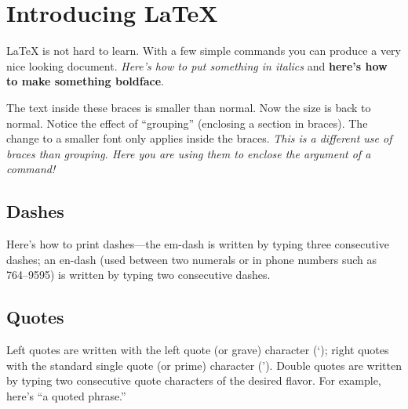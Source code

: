 \documentclass{article}                    %
\begin{document}
 
\section{Introducing LaTeX}                %
LaTeX is not hard to learn.  With a few simple commands you
can produce a very nice looking document.
\textit{Here's how to put something in italics} and 
\textbf{here's how to make something boldface}.

{\small The text inside these braces is smaller than normal.} Now the size
is back to normal.  
Notice the effect of ``grouping'' (enclosing a section in braces). 
The change to a smaller font only applies inside the braces. 
\textit{This is a different use of braces than grouping. Here you are
using them to enclose the argument of a command!}
  
\subsection{Dashes}                        %
Here's how to print dashes---the em-dash is written by typing three 
consecutive dashes; an en-dash (used between two numerals or in phone
numbers such as 764--9595) is written by typing two consecutive dashes. 

\subsection{Quotes}                        %
Left quotes are written with the left quote (or grave) character (`); 
right quotes with the standard single quote (or prime) character ('). 
Double quotes are written by typing two consecutive quote characters 
of the desired flavor. For example, here's ``a quoted phrase.''
 
\end{document}
